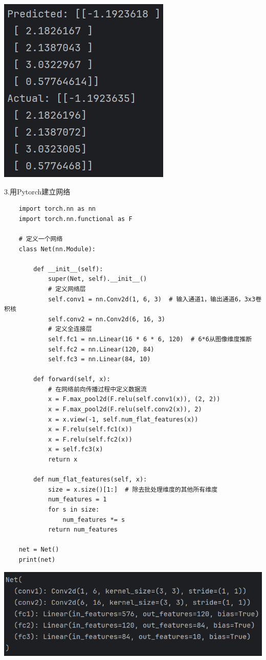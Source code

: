 \documentclass{article}
\begin{document}
\noindent
\begin{minipage}{\linewidth}
 \centering
  \includegraphics[width=0.5\linewidth]{学习19.png}
  \label{fig:example}
\end{minipage}


3.用Pytorch建立网络
\begin{verbatim}
    import torch.nn as nn
    import torch.nn.functional as F

    # 定义一个网络
    class Net(nn.Module):

        def __init__(self):
            super(Net, self).__init__()
            # 定义网络层
            self.conv1 = nn.Conv2d(1, 6, 3)  # 输入通道1，输出通道6，3x3卷积核
            self.conv2 = nn.Conv2d(6, 16, 3)
            # 定义全连接层
            self.fc1 = nn.Linear(16 * 6 * 6, 120)  # 6*6从图像维度推断
            self.fc2 = nn.Linear(120, 84)
            self.fc3 = nn.Linear(84, 10)

        def forward(self, x):
            # 在网络前向传播过程中定义数据流
            x = F.max_pool2d(F.relu(self.conv1(x)), (2, 2))
            x = F.max_pool2d(F.relu(self.conv2(x)), 2)
            x = x.view(-1, self.num_flat_features(x))
            x = F.relu(self.fc1(x))
            x = F.relu(self.fc2(x))
            x = self.fc3(x)
            return x

        def num_flat_features(self, x):
            size = x.size()[1:]  # 除去批处理维度的其他所有维度
            num_features = 1
            for s in size:
                num_features *= s
            return num_features

    net = Net()
    print(net)

\end{verbatim}


\noindent
\begin{minipage}{\linewidth}
 \centering
  \includegraphics[width=0.5\linewidth]{学习20.png}
  \label{fig:example}
\end{minipage}
\end{document}
